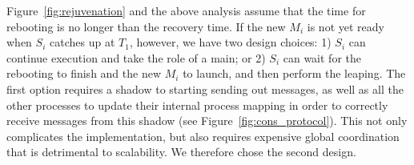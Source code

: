Figure~\ref{fig:rejuvenation} and the above analysis assume that the time for rebooting is no longer than the recovery time. If the new $M_i$ is not yet ready when $S_i$ catches up at $T_1$, however, we have two design choices: 1) $S_i$ can continue execution and take the role of a main; or 2) $S_i$ can wait for the rebooting to finish and the new $M_i$ to launch, and then perform the leaping.  The first option requires a shadow to starting sending out messages, as well as all the other processes to update their internal process mapping in order to correctly receive messages from this shadow (see Figure~\ref{fig:cons_protocol}). This not only complicates the implementation, but also requires expensive global coordination that is detrimental to scalability. We therefore chose the second design.



